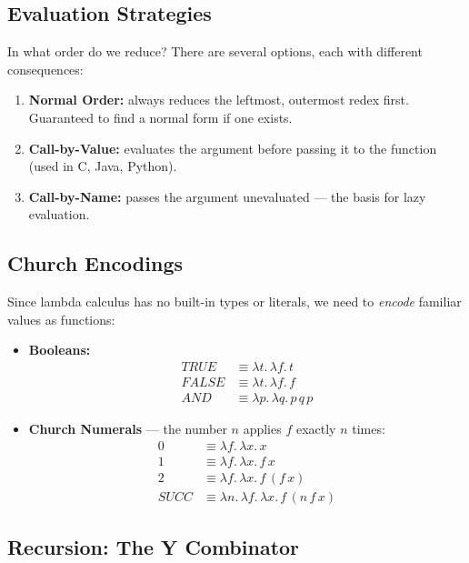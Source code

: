 \subsection{Evaluation Strategies}
In what order do we reduce? There are several options, each with different
consequences:

\begin{enumerate}
    \item \textbf{Normal Order:} always reduces the leftmost, outermost redex
    first. Guaranteed to find a normal form if one exists.
    \item \textbf{Call-by-Value:} evaluates the argument before passing it
    to the function (used in C, Java, Python).
    \item \textbf{Call-by-Name:} passes the argument unevaluated — the basis
    for lazy evaluation.
\end{enumerate}

\subsection{Church Encodings}
Since lambda calculus has no built-in types or literals, we need to
\emph{encode} familiar values as functions:

\begin{itemize}
    \item \textbf{Booleans:}
    \begin{align*}
        \mathit{TRUE}  &\equiv \lambda t.\, \lambda f.\, t \\
        \mathit{FALSE} &\equiv \lambda t.\, \lambda f.\, f \\
        \mathit{AND}   &\equiv \lambda p.\, \lambda q.\, p\, q\, p
    \end{align*}
    \item \textbf{Church Numerals} — the number $n$ applies $f$ exactly
    $n$ times:
    \begin{align*}
        0    &\equiv \lambda f.\, \lambda x.\, x \\
        1    &\equiv \lambda f.\, \lambda x.\, f\, x \\
        2    &\equiv \lambda f.\, \lambda x.\, f\,(f\, x) \\
        \mathit{SUCC} &\equiv \lambda n.\, \lambda f.\, \lambda x.\,
                               f\,(n\, f\, x)
    \end{align*}
\end{itemize}

\subsection{Recursion: The Y Combinator}

